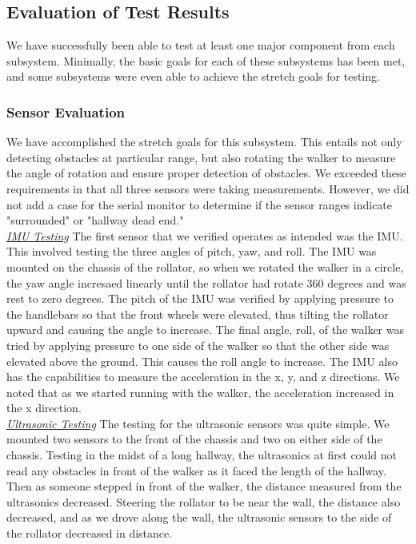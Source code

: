 \subsection{Evaluation of Test Results}
\noindent We have successfully been able to test at least one major component from each subsystem. Minimally, the basic goals for each of these subsystems has been met, and some subsystems were even able to achieve the stretch goals for testing.\\

\subsubsection{Sensor Evaluation}
\noindent We have accomplished the stretch goals for this subsystem. This entails not only detecting obstacles at particular range, but also rotating the walker to measure the angle of rotation and ensure proper detection of obstacles. We exceeded these requirements in that all three sensors were taking measurements. However, we did not add a case for the serial monitor to determine if the sensor ranges indicate "surrounded" or "hallway dead end."\\

\noindent \underline{\textit{IMU Testing}} \noindent The first sensor that we verified operates as intended was the IMU. This involved testing the three angles of pitch, yaw, and roll. The IMU was mounted on the chassis of the rollator, so when we rotated the walker in a circle, the yaw angle incresaed linearly until the rollator had rotate 360 degrees and was rest to zero degrees. The pitch of the IMU was verified by applying pressure to the handlebars so that the front wheels were elevated, thus tilting the rollator upward and causing the angle to increase. The final angle, roll, of the walker was tried by applying pressure to one side of the walker so that the other side was elevated above the ground. This causes the roll angle to increase. The IMU also has the capabilities to measure the acceleration in the x, y, and z directions. We noted that as we started running with the walker, the acceleration increased in the x direction.\\

\noindent \underline{\textit{Ultrasonic Testing}}
\noindent The testing for the ultrasonic sensors was quite simple. We mounted two sensors to the front of the chassis and two on either side of the chassis. Testing in the midst of a long hallway, the ultrasonics at first could not read any obstacles in front of the walker as it faced the length of the hallway. Then as someone stepped in front of the walker, the distance measured from the ultrasonics decreased. Steering the rollator to be near the wall, the distance also decreased, and as we drove along the wall, the ultrasonic sensors to the side of the rollator decreased in distance.\\


